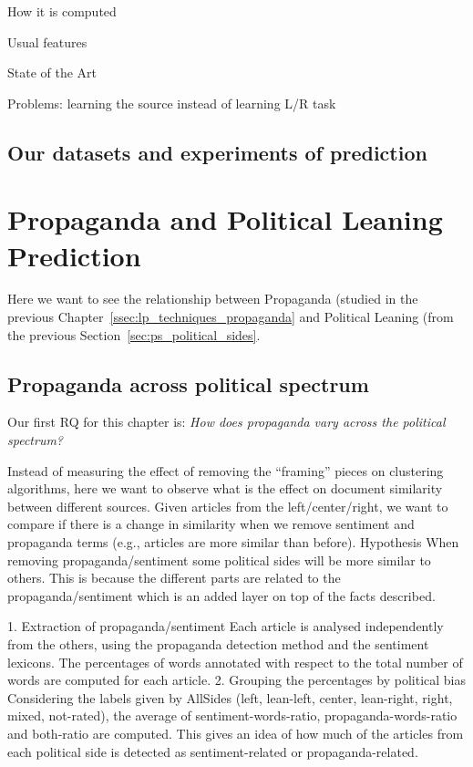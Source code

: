 How it is computed

Usual features

State of the Art

Problems: learning the source instead of learning L/R task

\subsection{Our datasets and experiments of prediction}

\section{\statusorange Propaganda and Political Leaning Prediction}
\label{sec:ps_prop_and_leaning}

Here we want to see the relationship between Propaganda (studied in the previous Chapter~\ref{ssec:lp_techniques_propaganda} and Political Leaning (from the previous Section~\ref{sec:ps_political_sides}.

\subsection{\statusorange Propaganda across political spectrum}

Our first RQ for this chapter is: \emph{How does propaganda vary across the political spectrum?}

Instead of measuring the effect of removing the “framing” pieces on clustering algorithms, here we want to observe what is the effect on document similarity between different sources.
Given articles from the left/center/right, we want to compare if there is a change in similarity when we remove sentiment and propaganda terms (e.g., articles are more similar than before).
Hypothesis
When removing propaganda/sentiment some political sides will be more similar to others. This is because the different parts are related to the propaganda/sentiment which is an added layer on top of the facts described.

1. Extraction of propaganda/sentiment
Each article is analysed independently from the others, using the propaganda detection method and the sentiment lexicons.
The percentages of words annotated with respect to the total number of words are computed for each article.
2. Grouping the percentages by political bias
Considering the labels given by AllSides (left, lean-left, center, lean-right, right, mixed, not-rated), the average of sentiment-words-ratio, propaganda-words-ratio and both-ratio are computed. This gives an idea of how much of the articles from each political side is detected as sentiment-related or propaganda-related.

